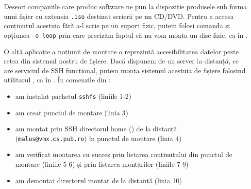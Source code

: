 Deseori companiile care produc software ne pun la dispoziție produsele sub forma unui fișier cu extensia \texttt{.iso} destinat scrierii pe un CD/DVD.
 Pentru a accesa conținutul acestuia fără a-l scrie pe un suport fizic, putem folosi comanda  și opțiunea \texttt{-o loop} prin care precizăm faptul că nu vom monta un disc fizic, ca în .


O altă aplicație a noțiunii de montare o reprezintă accesibilitatea datelor peste rețea din sistemul nostru de fișiere.
Dacă dispunem de un server la distanță, ce are serviciul de SSH funcțional, putem monta sistemul acestuia de fișiere folosind utilitarul , ca în .
 În comenzile din :

\begin{itemize}
  \item am instalat pachetul \texttt{sshfs} (liniile 1-2)
  \item am creat punctul de montare  (linia 3)
  \item am montat prin SSH directorul home () de la distanță (\texttt{malus@vmx.cs.pub.ro}) în punctul de montare (linia 4)
  \item am verificat montarea cu succes prin listarea conținutului din punctul de montare (liniile 5-6) și prin listarea montărilor (liniile 7-9)
  \item am demontat directorul montat de la distanță (linia 10)
\end{itemize}

